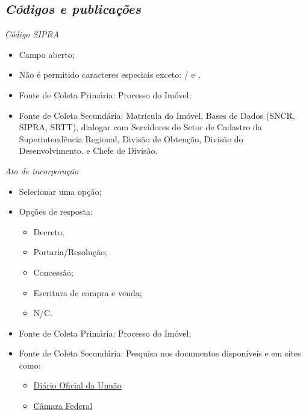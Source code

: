 \documentclass[
  letterpaper,
]{report}
\providecommand{\tightlist}{%
  \setlength{\itemsep}{0pt}\setlength{\parskip}{0pt}}\usepackage{longtable,booktabs,array}
\begin{document}
\hypertarget{cuxf3digos-e-publicauxe7uxf5es}{%
\subsection{\texorpdfstring{\emph{Códigos e
publicações}}{Códigos e publicações}}\label{cuxf3digos-e-publicauxe7uxf5es}}

\emph{Código SIPRA}

\begin{itemize}
\tightlist
\item
  Campo aberto;
\item
  Não é permitido caracteres especiais exceto: / e ,
\item
  Fonte de Coleta Primária: Processo do Imóvel;
\item
  Fonte de Coleta Secundária: Matrícula do Imóvel, Bases de Dados (SNCR,
  SIPRA, SRTT), dialogar com Servidores do Setor de Cadastro da
  Superintendência Regional, Divisão de Obtenção, Divisão do
  Desenvolvimento. e Chefe de Divisão.
\end{itemize}

\emph{Ato de incorporação}

\begin{itemize}
\item
  Selecionar uma opção;
\item
  Opções de resposta:

  \begin{itemize}
  \tightlist
  \item
    Decreto;
  \item
    Portaria/Resolução;
  \item
    Concessão;
  \item
    Escritura de compra e venda;
  \item
    N/C.
  \end{itemize}
\item
  Fonte de Coleta Primária: Processo do Imóvel;
\item
  Fonte de Coleta Secundária: Pesquisa nos documentos disponíveis e em
  sites como:

  \begin{itemize}
  \tightlist
  \item
    \href{https://www.in.gov.br/servicos/diario-oficial-da-uniao}{Diário
    Oficial da Unuão}
  \item
    \href{https://www.camara.leg.br/legislacao}{Câmara Federal}
  \end{itemize}
\end{itemize}
\end{document}
